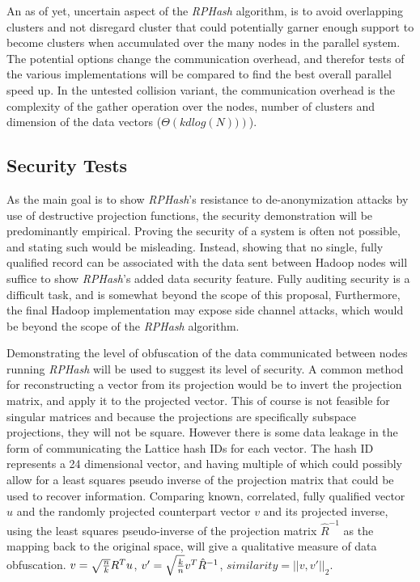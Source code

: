 \documentclass[a4paper,10pt]{article}
\begin{document}
An as of yet, uncertain aspect of the \emph{RPHash} algorithm, is to avoid
overlapping clusters and not disregard cluster that could potentially garner
enough support to become clusters when accumulated over the many nodes in the
parallel system.  The potential options change the communication overhead,
and therefor tests of the various implementations will be compared to find
the best overall parallel speed up.  In the untested collision variant,
the communication overhead is the complexity of the gather operation
over the nodes, number of clusters and dimension of the data vectors
($\Theta(kd{log(N))})$).

\subsection{Security Tests} As the main goal is to show \emph{RPHash}'s
resistance to de-anonymization attacks by use of destructive projection
functions, the security demonstration will be predominantly empirical.
Proving the security of a system is often not possible, and stating such
would be misleading.  Instead, showing that no single, fully qualified record
can be associated with the data sent between Hadoop nodes will suffice to
show \emph{RPHash}'s added data security feature.  Fully auditing security
is a difficult task, and is somewhat beyond the scope of this proposal,
Furthermore, the final Hadoop implementation may expose side channel attacks,
which would be beyond the scope of the \emph{RPHash} algorithm.

Demonstrating the level of obfuscation of the data communicated between
nodes running \emph{RPHash} will be used to suggest its level of security.
A common method for reconstructing a vector from its projection would be to
invert the projection matrix, and apply it to the projected vector.  This of
course is not feasible for singular matrices and because the projections are
specifically subspace projections, they will not be square.  However there
is some data leakage in the form of communicating the Lattice hash IDs for
each vector.  The hash ID represents a 24 dimensional vector, and having
multiple of which could possibly allow for a least squares pseudo inverse of
the projection matrix that could be used to recover information.  Comparing
known, correlated, fully qualified vector $u$ and the randomly projected
counterpart vector $v$ and its projected inverse, using the least squares
pseudo-inverse of the projection matrix $\hat{R}^{-1}$ as the mapping back
to the original space, will give a qualitative measure of data obfuscation.
$ v = \sqrt{{{n}\over{k}}}R^Tu $, $ v' = \sqrt{{{k}\over{n}}}v^T \hat{R}^{-1}
$, $ similarity = ||v,v'||_{2} $.
\end{document}
